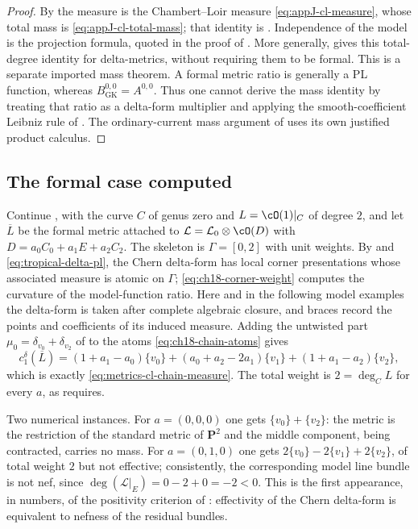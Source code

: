\begin{proof}
By  the measure is the Chambert--Loir measure
\eqref{eq:appJ-cl-measure}, whose total mass is
\eqref{eq:appJ-cl-total-mass}; that identity is
.  Independence of the model is the projection
formula, quoted in the proof of .
More generally, \cite[Proposition~10.3]{GK17} gives this total-degree
identity for delta-metrics, without requiring them to be formal.  This is
a separate imported mass theorem.  A formal metric ratio is generally a
PL function, whereas $B_{\mathrm{GK}}^{0,0}=A^{0,0}$.  Thus one cannot
derive the mass identity by treating that ratio as a delta-form multiplier
and applying the smooth-coefficient Leibniz rule of
.  The ordinary-current mass argument of
 uses its own justified product calculus.
\end{proof}

\subsection{The formal case computed}
\label{sec:ch18-formal-computed}

\begin{example}
\label{ex:ch18-chain-delta}
Continue , with the curve $C$ of genus zero and
$L=\cO(1)|_C$ of degree $2$, and let $\overline L$ be the formal metric
attached to $\mathcal L=\mathcal L_0\otimes\cO(D)$ with
$D=a_0C_0+a_1E+a_2C_2$.  The skeleton is $\Gamma=[0,2]$ with unit weights.
By  and \eqref{eq:tropical-delta-pl}, the
Chern delta-form has local corner presentations whose associated measure
is atomic on $\Gamma$; \eqref{eq:ch18-corner-weight} computes the curvature
of the model-function ratio.  Here and in the following model examples the
delta-form is taken after complete algebraic closure, and braces record
the points and coefficients of its induced measure.
Adding the untwisted part $\mu_0=\delta_{v_0}+\delta_{v_2}$ of
 to the atoms
\eqref{eq:ch18-chain-atoms} gives
\[
 c_1^\delta(\overline L)
 =(1+a_1-a_0)\{v_0\}+(a_0+a_2-2a_1)\{v_1\}+(1+a_1-a_2)\{v_2\},
\]
which is exactly \eqref{eq:metrics-cl-chain-measure}.  The total weight is
$2=\deg_CL$ for every $a$, as  requires.

Two numerical instances.  For $a=(0,0,0)$ one gets
$\{v_0\}+\{v_2\}$: the metric is the restriction of the standard metric of
$\mathbf P^2$ and the middle component, being contracted, carries no mass.
For $a=(0,1,0)$ one gets $2\{v_0\}-2\{v_1\}+2\{v_2\}$, of total weight $2$
but not effective; consistently, the corresponding model line bundle is not
nef, since $\deg(\mathcal L|_E)=0-2+0=-2<0$.  This is the first appearance,
in numbers, of the positivity criterion of
: effectivity of the Chern
delta-form is equivalent to nefness of the residual bundles.
\end{example}

